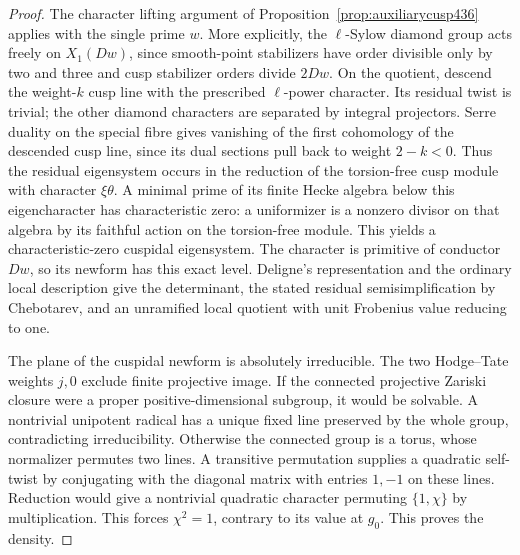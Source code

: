 \documentclass[a4paper,11pt]{article}
\theoremstyle{definition}
\theoremstyle{remark}
\numberwithin{equation}{section}
\begin{document}
\begin{proof}
The character lifting argument of
Proposition~\ref{prop:auxiliarycusp436} applies with the single
prime \(w\). More explicitly, the \(\ell\)-Sylow diamond group
acts freely on \(X_1(Dw)\), since smooth-point stabilizers
have order divisible only by two and three and cusp stabilizer
orders divide \(2Dw\). On the quotient, descend the weight-\(k\)
cusp line with the prescribed \(\ell\)-power character. Its
residual twist is trivial; the other diamond characters are
separated by integral projectors. Serre duality on the special
fibre gives vanishing of the first cohomology of the descended
cusp line, since its dual sections pull back to weight \(2-k<0\).
Thus the residual eigensystem occurs in the reduction of the
torsion-free cusp module with character \(\xi\theta\).
A minimal prime of its finite Hecke algebra below this
eigencharacter has characteristic zero: a uniformizer is a
nonzero divisor on that algebra by its faithful action on the
torsion-free module. This yields a characteristic-zero
cuspidal eigensystem. The character is primitive of conductor
\(Dw\), so its newform has this exact level. Deligne's
representation and the ordinary local description give the
determinant, the stated residual semisimplification by
Chebotarev, and an unramified local quotient with unit
Frobenius value reducing to one.~\cite{XII-IX-V-deligne,XII-IX-ordinary361}

The plane of the cuspidal newform is absolutely irreducible.
The two Hodge--Tate weights \(j,0\) exclude finite projective
image. If the connected projective Zariski closure were a
proper positive-dimensional subgroup, it would be solvable.
A nontrivial unipotent radical has a unique fixed line
preserved by the whole group, contradicting irreducibility.
Otherwise the connected group is a torus, whose normalizer
permutes two lines. A transitive permutation supplies a
quadratic self-twist by conjugating with the diagonal matrix
with entries \(1,-1\) on these lines. Reduction would give
a nontrivial quadratic character permuting \(\{1,\chi\}\)
by multiplication. This forces \(\chi^2=1\), contrary to
its value at \(g_0\). This proves the density.
\end{proof}
\end{document}
